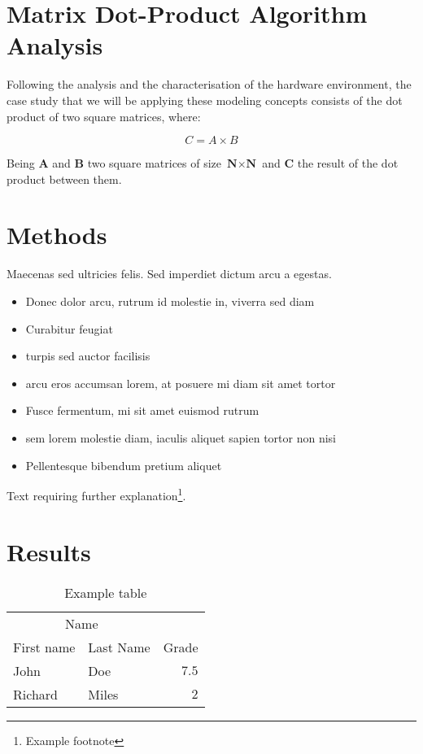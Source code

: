 \documentclass[twoside,twocolumn]{article}
\begin{document}
\section{Matrix Dot-Product Algorithm Analysis}

Following the analysis and the characterisation of the hardware environment, the case study that we will be applying these modeling concepts consists of the dot product of two square matrices, where:

$$C = A \times B$$

Being \textbf{A} and \textbf{B} two square matrices of size $\textbf{N} \times \textbf{N}$ and \textbf{C} the result of the dot product between them.

\section{Methods}

Maecenas sed ultricies felis. Sed imperdiet dictum arcu a egestas. 
\begin{itemize}
\item Donec dolor arcu, rutrum id molestie in, viverra sed diam
\item Curabitur feugiat
\item turpis sed auctor facilisis
\item arcu eros accumsan lorem, at posuere mi diam sit amet tortor
\item Fusce fermentum, mi sit amet euismod rutrum
\item sem lorem molestie diam, iaculis aliquet sapien tortor non nisi
\item Pellentesque bibendum pretium aliquet
\end{itemize}
\blindtext %

Text requiring further explanation\footnote{Example footnote}.


\section{Results}

\begin{table}
\caption{Example table}
\centering
\begin{tabular}{llr}
\toprule
\multicolumn{2}{c}{Name} \\
\cmidrule(r){1-2}
First name & Last Name & Grade \\
\midrule
John & Doe & $7.5$ \\
Richard & Miles & $2$ \\
\bottomrule
\end{tabular}
\end{table}
\end{document}
